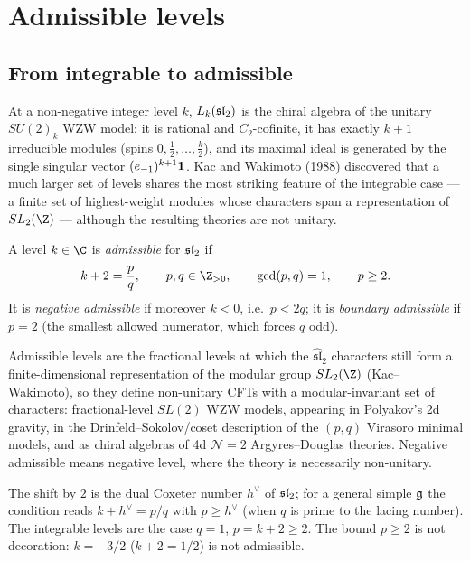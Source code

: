\section{Admissible levels}\label{l09:sec:admissible}

\subsection{From integrable to admissible}

At a non-negative integer level $k$, $L_k(\mathfrak{sl}_2)$ is the chiral algebra of the unitary $SU(2)_k$
WZW model: it is rational and $C_2$-cofinite, it has exactly $k+1$ irreducible modules (spins
$0,\tfrac12,\ldots,\tfrac k2$), and its maximal ideal is generated by the single singular vector
$(e_{-1})^{k+1}\mathbf{1}$. Kac and Wakimoto (1988) discovered that a much larger set of levels
shares the most striking feature of the integrable case --- a finite set of highest-weight modules
whose characters span a representation of $SL_2(\Z)$ --- although the resulting theories are not
unitary.

\begin{definition}\label{l09:def:admissible}
A level $k\in\C$ is \emph{admissible} for $\mathfrak{sl}_2$ if
\begin{equation*}
  k + 2 = \frac{p}{q},\qquad p,q\in\Z_{>0},\qquad \gcd(p,q) = 1,\qquad p\ge 2 .
\end{equation*}
It is \emph{negative admissible} if moreover $k<0$, i.e.\ $p<2q$; it is \emph{boundary admissible} if
$p = 2$ (the smallest allowed numerator, which forces $q$ odd).
\end{definition}
\begin{physics}
Admissible levels are the fractional levels at which the $\widehat{\mathfrak{sl}}_2$ characters still
form a finite-dimensional representation of the modular group $SL_2(\Z)$ (Kac--Wakimoto), so they define
non-unitary CFTs with a modular-invariant set of characters: fractional-level $SL(2)$ WZW models, appearing in
Polyakov's 2d gravity, in the Drinfeld--Sokolov/coset description of the $(p,q)$ Virasoro minimal models,
and as chiral algebras of 4d $\mathcal{N}=2$ Argyres--Douglas theories. Negative admissible means negative
level, where the theory is necessarily non-unitary.
\end{physics}


The shift by $2$ is the dual Coxeter number $h^\vee$ of $\mathfrak{sl}_2$; for a general simple
$\mathfrak{g}$ the condition reads $k+h^\vee = p/q$ with $p\ge h^\vee$ (when $q$ is prime to the lacing
number). The integrable levels are the case $q = 1$, $p = k+2\ge2$. The bound $p\ge2$ is not
decoration: $k = -3/2$ ($k+2 = 1/2$) is not admissible.


